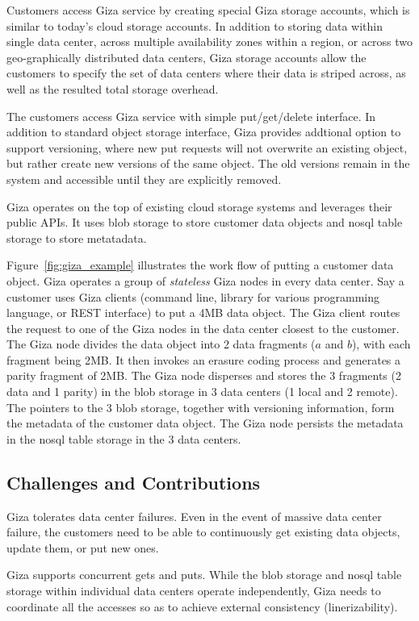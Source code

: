 Customers access Giza service by creating special Giza storage accounts, which is similar to today's cloud storage accounts. In addition to storing data within single data center, across multiple availability zones within a region, or across two geo-graphically distributed data centers, Giza storage accounts allow the customers to specify the set of data centers where their data is striped across, as well as the resulted total storage overhead.

The customers access Giza service with simple put/get/delete interface. In addition to standard object storage interface, Giza provides addtional option to support versioning, where new put requests will not overwrite an existing object, but rather create new versions of the same object. The old versions remain in the system and accessible until they are explicitly removed.

Giza operates on the top of existing cloud storage systems and leverages their public APIs. It uses blob storage to store customer data objects and nosql table storage to store metatadata.

Figure~\ref{fig:giza_example} illustrates the work flow of putting a customer data object. Giza operates a group of {\em stateless} Giza nodes in every data center. Say a customer uses Giza clients (command line, library for various programming language, or REST interface) to put a 4MB data object. The Giza client routes the request to one of the Giza nodes in the data center closest to the customer. The Giza node divides the data object into 2 data fragments ($a$ and $b$), with each fragment being 2MB. It then invokes an erasure coding process and generates a parity fragment of 2MB. The Giza node disperses and stores the 3 fragments (2 data and 1 parity) in the blob storage in 3 data centers (1 local and 2 remote). The pointers to the 3 blob storage, together with versioning information, form the metadata of the customer data object. The Giza node persists the metadata in the nosql table storage in the 3 data centers.

\subsection{Challenges and Contributions}

Giza tolerates data center failures. Even in the event of massive data center failure, the customers need to be able to continuously get existing data objects, update them, or put new ones.

Giza supports concurrent gets and puts. While the blob storage and nosql table storage within individual data centers operate independently, Giza needs to coordinate all the accesses so as to achieve external consistency (linerizability).

